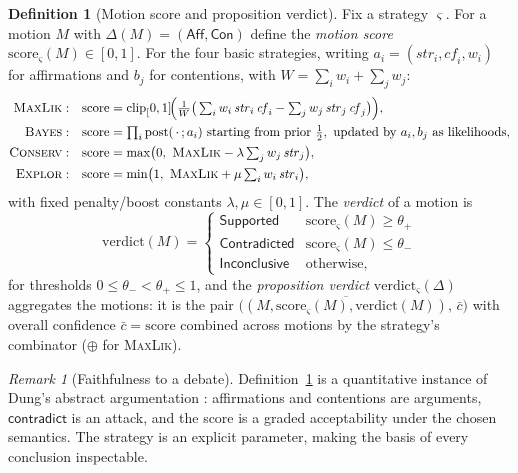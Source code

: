 \documentclass[11pt,a4paper]{article}
\theoremstyle{plain}
\theoremstyle{definition}
\newtheorem{definition}[theorem]{Definition}
\theoremstyle{remark}
\newtheorem{remark}[theorem]{Remark}
\newcommand{\Unit}{[0,1]}
\newcommand{\nor}{\oplus}                                 %
\newcommand{\Strat}{\varsigma}
\begin{document}
\begin{definition}[Motion score and proposition verdict]
\label{def:score}
Fix a strategy $\Strat$. For a motion $M$ with
$\Delta(M)=(\mathsf{Aff},\mathsf{Con})$ define the \emph{motion score}
$\mathrm{score}_\Strat(M)\in\Unit$. For the four basic strategies, writing
$a_i=(\mathit{str}_i,\mathit{cf}_i,w_i)$ for affirmations and $b_j$ for
contentions, with $W=\sum_i w_i+\sum_j w_j$:
\begin{align*}
\textsc{MaxLik}:\quad& \mathrm{score}=\mathrm{clip}_\Unit\!\Big(
   \tfrac{1}{W}\big(\textstyle\sum_i w_i\,\mathit{str}_i\,\mathit{cf}_i
   -\sum_j w_j\,\mathit{str}_j\,\mathit{cf}_j\big)\Big),\\
\textsc{Bayes}:\quad& \mathrm{score}=\textstyle\prod_i
   \mathrm{post}(\,\cdot\,;a_i)\ \text{starting from prior } \tfrac12,\
   \text{updated by } a_i,b_j\ \text{as likelihoods},\\
\textsc{Conserv}:\quad& \mathrm{score}=\max\!\big(0,\ \textsc{MaxLik}
   -\lambda\textstyle\sum_j w_j\,\mathit{str}_j\big),\\
\textsc{Explor}:\quad& \mathrm{score}=\min\!\big(1,\ \textsc{MaxLik}
   +\mu\textstyle\sum_i w_i\,\mathit{str}_i\big),
\end{align*}
with fixed penalty/boost constants $\lambda,\mu\in\Unit$. The \emph{verdict} of
a motion is
\[
\mathrm{verdict}(M)=\begin{cases}
\textsf{Supported} & \mathrm{score}_\Strat(M)\ge\theta_+\\
\textsf{Contradicted} & \mathrm{score}_\Strat(M)\le\theta_-\\
\textsf{Inconclusive} & \text{otherwise,}
\end{cases}
\]
for thresholds $0\le\theta_-<\theta_+\le1$, and the \emph{proposition verdict}
$\mathrm{verdict}_\Strat(\Delta)$ aggregates the motions: it is the pair
$\big(\overline{(M,\mathrm{score}_\Strat(M),\mathrm{verdict}(M))},\,
\bar{c}\big)$ with overall confidence $\bar c=\mathrm{score}$ combined across
motions by the strategy's combinator ($\nor$ for \textsc{MaxLik}).
\end{definition}

\begin{remark}[Faithfulness to a debate]
Definition~\ref{def:score} is a quantitative instance of Dung's abstract
argumentation \citep{dung1995}: affirmations and contentions are arguments,
$\mathsf{contradict}$ is an attack, and the score is a graded acceptability
under the chosen semantics. The strategy is an explicit parameter, making the
basis of every conclusion inspectable.
\end{remark}
\end{document}
